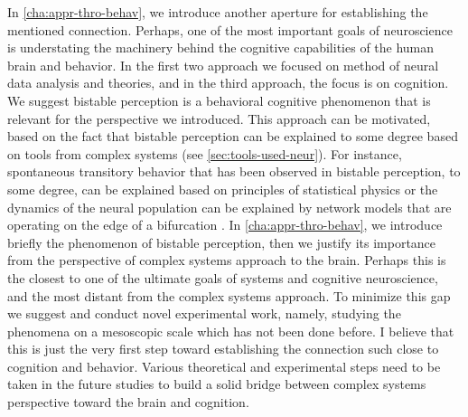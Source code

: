 In \autoref{cha:appr-thro-behav}, we introduce another aperture for establishing the mentioned connection.
Perhaps, one of the most important goals of neuroscience is understating the machinery behind the cognitive capabilities of the human brain and  behavior.
In the first two approach we focused on method of neural data analysis and theories,
and in the third approach, the focus is on cognition.
We suggest bistable perception is a behavioral cognitive phenomenon that is relevant for the perspective we introduced.
This approach can be motivated, based on the fact that
bistable perception can be explained to some degree based on tools from complex systems
(see \autoref{sec:tools-used-neur}).
For instance, spontaneous transitory behavior that has been observed in bistable perception,
to some degree, can be explained based on principles of statistical physics \cite{bialekRandomSwitchingOptimal1995,atwalStatisticalMechanicsMultistable2014}
or the dynamics of the neural population can be explained by network models that are operating on the edge of a bifurcation \cite{theodoniCorticalMicrocircuitDynamics2011a,pastukhovMultistablePerceptionBalances2013a}.
In \autoref{cha:appr-thro-behav}, we introduce briefly the phenomenon of bistable perception,
then we justify its importance from the perspective of complex systems approach to the brain.
Perhaps this is the closest to one of the ultimate goals of systems and cognitive neuroscience,
and the most distant from the complex systems approach.
To minimize this gap we suggest and conduct novel experimental work,
namely, studying the phenomena on a mesoscopic scale which has not been done before.
I believe that this is just the very first step toward establishing the connection
such close to cognition and behavior.
Various theoretical and experimental steps need to be taken in the future studies to build a solid bridge between complex systems perspective toward the brain and cognition.




